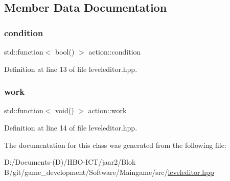 \subsection{Member Data Documentation}
\mbox{\label{classaction_a949abf979a5255f54e88a6a4273afebe}} 
\subsubsection{\texorpdfstring{condition}{condition}}
{\footnotesize\ttfamily std\+::function$<$ bool() $>$ action\+::condition\hspace{0.3cm}{\ttfamily [private]}}



Definition at line 13 of file leveleditor.\+hpp.

\mbox{\label{classaction_a1cab66c9a7adf408ebb3734e5d95315b}} 
\subsubsection{\texorpdfstring{work}{work}}
{\footnotesize\ttfamily std\+::function$<$ void() $>$ action\+::work\hspace{0.3cm}{\ttfamily [private]}}



Definition at line 14 of file leveleditor.\+hpp.



The documentation for this class was generated from the following file\+:\begin{DoxyCompactItemize}
\item 
D\+:/\+Documents-\/(\+D)/\+H\+B\+O-\/\+I\+C\+T/jaar2/\+Blok B/git/game\+\_\+development/\+Software/\+Maingame/src/\hyperlink{leveleditor_8hpp}{leveleditor.\+hpp}\end{DoxyCompactItemize}
